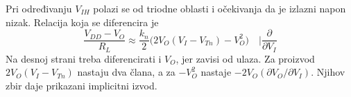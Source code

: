 Pri određivanju $V_{IH}$ polazi se od triodne oblasti i očekivanja da je izlazni napon nizak. Relacija koja se diferencira je
\[\frac{V_{DD}-V_O}{R_L}\approx\frac{k_n}{2}\bigl(2V_O(V_I-V_{Tn})-V_O^2\bigr)\quad\Bigg|\frac\partial{\partial V_I}\]
Na desnoj strani treba diferencirati i $V_O$, jer zavisi od ulaza. Za proizvod $2V_O(V_I-V_{Tn})$ nastaju dva člana, a za $-V_O^2$ nastaje $-2V_O(\partial V_O/\partial V_I)$. Njihov zbir daje prikazani implicitni izvod.
